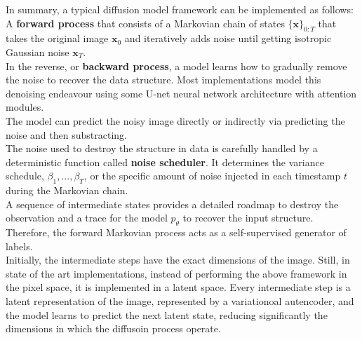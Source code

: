 In summary, a typical diffusion model framework can be implemented as follows:\\

A \textbf{forward process} that consists of a Markovian chain of states $\{\mathbf{x}\}_{0:T}$ that takes the original image $\mathbf{x}_0$ and iteratively adds noise until getting isotropic Gaussian noise $\mathbf{x}_{T}$. \\

In the reverse, or \textbf{backward process}, a model learns how to gradually remove the noise to recover the data structure. Most implementations model this denoising endeavour using some U-net neural network architecture with attention modules. \\

The model can predict the noisy image directly or indirectly via predicting the noise and then substracting.\\

The noise used to destroy the structure in data is carefully handled by a deterministic function called \textbf{noise scheduler}. It determines the variance schedule, $\beta_{1}, \dots, \beta_{T}$, or the specific amount of noise injected in each timestamp $t$ during the Markovian chain. \\

A sequence of intermediate states provides a detailed roadmap to destroy the observation and a trace for the model $p_{\theta}$ to recover the input structure. Therefore, the forward Markovian process acts as a self-supervised generator of labels. \\

Initially, the intermediate steps have the exact dimensions of the image. Still, in state of the art implementations, instead of performing the above framework in the pixel space, it is implemented in a latent space. Every intermediate step is a latent representation of the image, represented by a variationoal autencoder, and the model learns to predict the next latent state, reducing significantly the dimensions in which the diffusoin process operate.\ 
